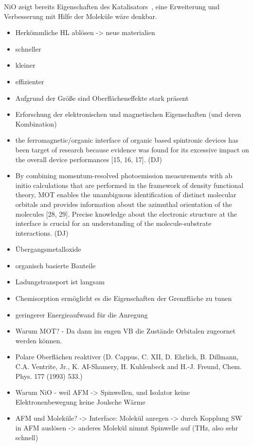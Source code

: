     NiO zeigt bereits Eigenschaften des Katalisators~\cite{kunz_chemisorption_1985}, eine Erweiterung und Verbesserung mit Hilfe der Moleküle wäre denkbar.
\begin{itemize}
    \item Herkömmliche HL ablösen -> neue materialien
    \item schneller
    \item kleiner
    \item effizienter
    \item Aufgrund der Größe sind Oberflächeneffekte stark präsent
    \item Erforschung der elektronischen und magnetischen Eigenschaften (und deren Kombination)
    \item the ferromagnetic/organic interface of organic     based spintronic devices has been target of research because evidence was found for its excessive impact on the overall device performances [15, 16, 17]. (DJ)
    \item By combining momentum-resolved photoemission measurements with ab initio calculations that are performed in the framework of density functional theory, MOT enables the unambiguous identification of distinct molecular orbitals and provides information about the azimuthal orientation of the molecules [28, 29]. Precise knowledge about the electronic structure at the interface is crucial for an understanding of the molecule-substrate interactions. (DJ)
    \item Übergangsmetalloxide
    \item organisch basierte Bauteile
    \item Ladungstransport ist langsam
    \item Chemisorption ermöglicht es die Eigenschaften der Grenzfläche zu tunen
    \item geringerer Energieaufwand für die Anregung
    \item Warum MOT? - Da dann im engen VB die Zustände Orbitalen zugeornet werden können.
    \item Polare Oberflächen reaktiver (D. Cappus, C. XII, D. Ehrlich, B. Dillmann, C.A. Ventrite, Jr., K. AI-Shamery, H. Kuhlenbeck and H.-J. Freund, Chem. Phys. 177 (1993) 533.)
    \item Warum NiO - weil AFM -> Spinwellen, und Isolator keine Elektronenbewegung keine Joulsche Wärme
    \item AFM und Moleküle? -> Interface: Molekül anregen -> durch Kopplung SW in AFM auslösen -> anderes Molekül nimmt Spinwelle auf (THz, also sehr schnell)

\end{itemize}
